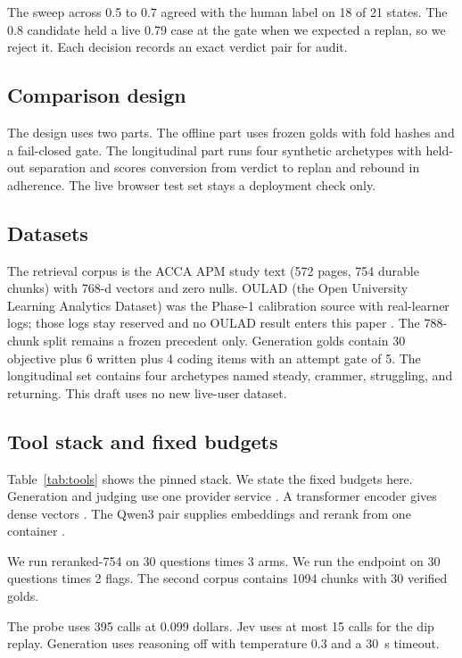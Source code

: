 \documentclass[sn-mathphys,Numbered]{sn-jnl}%
\theoremstyle{thmstyleone}%
\theoremstyle{thmstyletwo}%
\theoremstyle{thmstylethree}%
\begin{document}
The sweep across 0.5 to 0.7 agreed with the human label on 18 of 21 states. The 0.8 candidate held a live 0.79 case at the gate when we expected a replan, so we reject it. Each decision records an exact verdict pair for audit.

\subsection{Comparison design}\label{subsec35}

The design uses two parts. The offline part uses frozen golds with fold hashes and a fail-closed gate. The longitudinal part runs four synthetic archetypes with held-out separation and scores conversion from verdict to replan and rebound in adherence. The live browser test set stays a deployment check only.

\subsection{Datasets}\label{subsec36}

The retrieval corpus is the ACCA APM study text (572 pages, 754 durable chunks) with 768-d vectors and zero nulls. OULAD (the Open University Learning Analytics Dataset) was the Phase-1 calibration source with real-learner logs; those logs stay reserved and no OULAD result enters this paper \cite{oulad2017}. The 788-chunk split remains a frozen precedent only. Generation golds contain 30 objective plus 6 written plus 4 coding items with an attempt gate of 5. The longitudinal set contains four archetypes named steady, crammer, struggling, and returning. This draft uses no new live-user dataset.

\subsection{Tool stack and fixed budgets}\label{subsec37}

Table~\ref{tab:tools} shows the pinned stack. We state the fixed budgets here. Generation and judging use one provider service \cite{openrouter}. A transformer encoder gives dense vectors \cite{vaswani2017}. The Qwen3 pair supplies embeddings and rerank from one container \cite{qwen3emb,qwen3rerank}.

We run reranked-754 on 30 questions times 3 arms. We run the endpoint on 30 questions times 2 flags. The second corpus contains 1094 chunks with 30 verified golds.

The probe uses 395 calls at 0.099 dollars. Jev uses at most 15 calls for the dip replay. Generation uses reasoning off with temperature 0.3 and a 30~s timeout.
\end{document}
